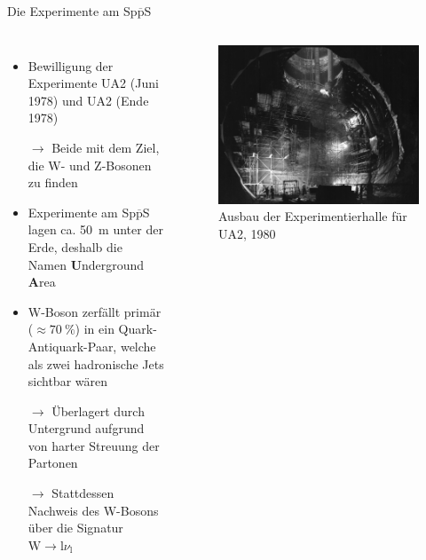 \documentclass[aspectratio=1610, professionalfonts, 10pt]{beamer}
\begin{document}
\begin{frame}{Die Experimente am Sp$\overline{\text{p}}$S}
	\begin{columns}
				\begin{itemize}
					\setlength\itemsep{0.5em}
					\item Bewilligung der Experimente UA2 (Juni 1978) und UA2 (Ende 1978)
					\item[$\rightarrow$] Beide mit dem Ziel, die W- und Z-Bosonen zu finden
					\item Experimente am Sp$\overline{\text{p}}$S lagen ca. \SI{50}{\metre} unter der Erde, deshalb die Namen \textbf{U}nderground \textbf{A}rea
					\item W-Boson zerfällt primär ($\approx \SI{70}{\percent}$) in ein Quark-Antiquark-Paar, welche als zwei hadronische Jets sichtbar wären
					\item[$\rightarrow$] Überlagert durch Untergrund aufgrund von harter Streuung der Partonen
					\item[$\rightarrow$] Stattdessen Nachweis des W-Bosons über die Signatur $\text{W} \rightarrow \text{l} \nu_\text{l}$
				\end{itemize}
			\begin{figure}
	  			\centering
				\includegraphics[width=\linewidth]{Images/8002262.jpg}
				\caption{Ausbau der Experimentierhalle für UA2, 1980 \cite{CERN-PHOTO-8002262}}
	  			\label{fig:sad}
			\end{figure}
	\end{columns}
\end{frame}
\end{document}

